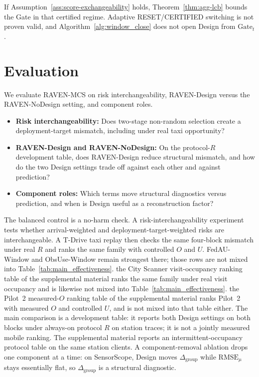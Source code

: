 \documentclass[letterpaper,journal]{IEEEtran}
\begin{document}
If Assumption~\ref{ass:score-exchangeability} holds, Theorem~\ref{thm:agg-lcb}
bounds the Gate in that certified regime.  Adaptive RESET/CERTIFIED switching
is not proven valid, and Algorithm~\ref{alg:window_close} does not open Design
from $\mathrm{Gate}_t$.

\section{Evaluation}
\label{sec:evaluation}

We evaluate RAVEN-MCS on risk interchangeability, RAVEN-Design versus
the RAVEN-NoDesign setting, and component roles.

\begin{itemize}
    \item \textbf{Risk interchangeability:} Does two-stage non-random
    selection create a deployment-target mismatch, including under real
    taxi opportunity?
    \item \textbf{RAVEN-Design and RAVEN-NoDesign:} On the protocol-$R$
    development table, does RAVEN-Design reduce structural mismatch, and
    how do the two Design settings trade off against each other and against
    prediction?
    \item \textbf{Component roles:} Which terms move structural
    diagnostics versus prediction, and when is Design useful as a
    reconstruction factor?
\end{itemize}

The balanced control is a no-harm check.  A risk-interchangeability experiment tests whether arrival-weighted and
deployment-target-weighted risks are interchangeable.  A T-Drive taxi
replay then checks the same four-block mismatch under real $R$ and ranks
the same family with controlled $O$ and $U$.  FedAU-Window and ObsUse-Window
remain strongest there; those rows are not mixed into
Table~\ref{tab:main_effectiveness}.
the City Scanner visit-occupancy ranking table of the supplemental material ranks the same family under real
visit occupancy and is likewise not mixed into
Table~\ref{tab:main_effectiveness}.
the Pilot~2 measured-$O$ ranking table of the supplemental material ranks Pilot~2 with measured
$O$ and controlled $U$, and is not mixed into that table either.
The main comparison is a development table: it reports both Design settings
on both blocks
under always-on protocol $R$ on station traces; it is not a jointly
measured mobile ranking.  The supplemental material reports an
intermittent-occupancy protocol table on the same station clients.  A
component-removal ablation drops one component at a time: on SensorScope,
Design moves $\Delta_{\mathrm{group}}$ while $\mathrm{RMSE}_{\mu}$ stays
essentially flat, so $\Delta_{\mathrm{group}}$ is a structural diagnostic.
\end{document}
